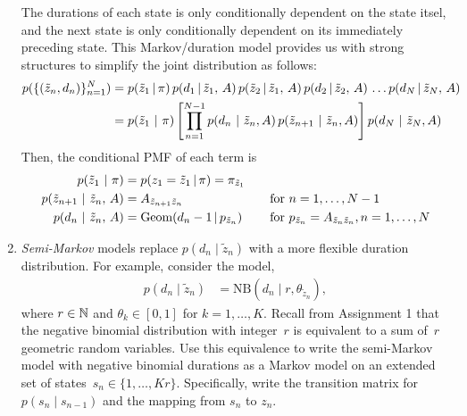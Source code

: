 \documentclass[11pt]{article}
\begin{document}
\begin{enumerate}[label=(\alph*)]
    \begin{solution}
    The durations of each state is only conditionally dependent on the state itsel, and the next state is only conditionally dependent on its immediately preceding state. This Markov/duration model provides us with strong structures to simplify the joint distribution as follows:
    \begin{align*}
        p(\{(\tilde{z}_n, d_n)\}_{n=1}^N)
            &= p(\tilde{z}_1\,|\,\pi)\,p(d_1 \,|\, \tilde{z}_1,\,A)\,
                p(\tilde{z}_2\,|\, \tilde{z}_1,\,A)\,p(d_2 \,|\, \tilde{z}_2,\,A)\,
                \ldots p(d_N \,|\, \tilde{z}_{N}, \,A) \\
            &= p(\tilde{z}_1 ~\vert~ \pi) \left[ \prod_{n=1}^{N-1} p(d_n ~\vert~ \tilde{z}_n, A) \, p(\tilde{z}_{n+1} ~\vert~ \tilde{z}_n, A) \right] p(d_N ~\vert~ \tilde{z}_N, A)
    \end{align*}
    Then, the conditional PMF of each term is
    \begin{align*}
        p(\tilde{z}_1 ~\vert~ \pi)
            &= p(z_1 = \tilde{z}_1 \,|\, \pi) = \pi_{\tilde{z}_1}
            && \\
        p(\tilde{z}_{n+1} ~\vert~ \tilde{z}_n,\, A)
            &= A_{\tilde{z}_{n+1}\tilde{z}_{n}}
            &&\quad \textrm{for } n=1,\ldots,N-1 \\
        p(d_n ~\vert~ \tilde{z}_n,\, A)
            &= \textrm{Geom}(d_n-1\,|\, p_{\tilde{z}_{n}})
            &&\quad \textrm{for } p_{\tilde{z}_{n}}=A_{\tilde{z}_{n}\tilde{z}_{n}}, n=1,\ldots,N
    \end{align*}
    \end{solution}
    
    \item \emph{Semi-Markov} models replace $p(d_n \mid \tilde{z}_n)$ with a more flexible duration distribution.  For example, consider the model,
    \begin{align*}
        p(d_n \mid \tilde{z}_n) &= \mathrm{NB}(d_n \mid r, \theta_{\tilde{z}_n}),
    \end{align*}
    where $r \in \mathbb{N}$ and $\theta_k \in [0, 1]$ for $k=1,\ldots,K$.  Recall from Assignment 1 that the negative binomial distribution with integer~$r$ is equivalent to a sum of~$r$ geometric random variables.  Use this equivalence to write the semi-Markov model with negative binomial durations as a Markov model on an extended set of states~$s_n \in \{1, \ldots, Kr\}$.  Specifically, write the transition matrix for $p(s_n \mid s_{n-1})$ and the mapping from $s_n$ to $z_n$.
    

\end{enumerate}
\end{document}
